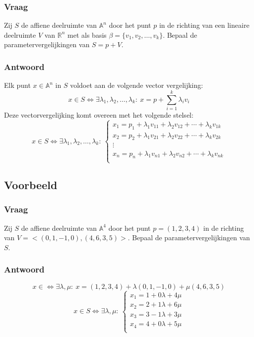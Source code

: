 \documentclass[main.tex]{subfiles}
\begin{document}
\subsubsection{Vraag}
\begin{center}
  Zij $S$ de affiene deelruimte van $\mathbb{A}^{n}$ door het punt $p$ in de richting van een lineaire deelruimte $V$ van $\mathbb{R}^{n}$ met als basis $\beta=\{v_{1},v_{2},\dotsc,v_{k}\}$.
  Bepaal de parametervergelijkingen van $S=p+V$.
\end{center}
\subsubsection{Antwoord}
Elk punt $x\in \mathbb{A}^{n}$ in $S$ voldoet aan de volgende vector vergelijking:
\[ x\in S \Leftrightarrow \exists \lambda_{1},\lambda_{2},\dotsc ,\lambda_{k}:\ x =  p  + \sum_{i=1}^{k}\lambda_{i}v_{i} \]
Deze vectorvergelijking komt overeen met het volgende stelsel:
\[
x \in S \Leftrightarrow \exists \lambda_{1},\lambda_{2},\dotsc ,\lambda_{k}:\
\left\{
  \begin{array}{c}
    x_{1} = p_{1} + \lambda_{1}v_{11} + \lambda_{2}v_{12} + \dotsb + \lambda_{k}v_{1k}\\
    x_{2} = p_{2} + \lambda_{1}v_{21} + \lambda_{2}v_{22} + \dotsb + \lambda_{k}v_{2k}\\
    \vdots \\
    x_{n} = p_{n} + \lambda_{1}v_{n1} + \lambda_{2}v_{n2} + \dotsb + \lambda_{k}v_{nk}\\
  \end{array}
\right.
\]

\subsection{Voorbeeld}
\subsubsection{Vraag}
\begin{center}
  Zij $S$ de affiene deelruimte van $\mathbb{A}^{4}$ door het punt $p= (1,2,3,4)$ in de richting van $V = <(0,1,-1,0), (4,6,3,5)>$.
  Bepaal de parametervergelijkingen van $S$.
\end{center}
\subsubsection{Antwoord}
\[
x \in \Leftrightarrow \exists \lambda,\mu:\ x = (1,2,3,4) + \lambda (0,1,-1,0) + \mu (4,6,3,5)
\]
\[
x \in S \Leftrightarrow \exists \lambda, \mu:\
\left\{
  \begin{array}{c}
    x_{1} = 1 + 0\lambda + 4\mu\\
    x_{2} = 2 + 1\lambda + 6\mu\\
    x_{3} = 3 - 1\lambda + 3\mu\\
    x_{4} = 4 + 0\lambda + 5\mu\\
  \end{array}
\right.
\]
\end{document}
